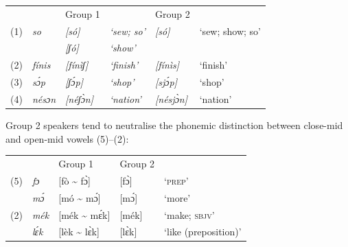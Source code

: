 \bigskip
\noindent\begin{tabularx}{\textwidth}{l llX lX}
 &  & Group 1 &  & Group 2 & \\
(1)





         & \itshape so & \itshape \textup{[só]} & \itshape \textup{‘sew; so’} & \itshape \textup{[só]}  & ‘sew; show; so’\\
&  & \itshape \textup{[ʃó]}  & \itshape \textup{‘show’} &  & \\
(2)




         & \itshape fínis & \itshape \textup{[fínìʃ]} & \itshape \textup{‘finish’} & \itshape \textup{[fínìs]} & ‘finish’\\
(3)





         & \itshape sɔ́p & \itshape \textup{[ʃɔ́p]} & \itshape \textup{‘shop’} & \itshape \textup{[sjɔ́p]} & ‘shop’\\
(4)





         & \itshape nésɔn & \itshape \textup{[néʃɔ̀n]} & \itshape \textup{‘nation’} & \itshape \textup{[nésjɔ̀n]} & ‘nation’\\
\end{tabularx}

\bigskip
Group 2 speakers tend to neutralise the phonemic distinction between close-mid and open-mid vowels (5)–(2):

\bigskip
\noindent\begin{tabularx}{\textwidth}{l lX lX}
 &  & Group 1 & Group 2 & \\
(5)





         & \itshape fɔ & [fò {\textasciitilde} fɔ̀] & [fɔ̀] & ‘\textsc{prep}’\\
& \itshape mɔ́ & [mó {\textasciitilde} mɔ́] & [mɔ́] & ‘more’\\
(2)





         & \itshape mék & [mék {\textasciitilde} mɛ́k] & [mék] & ‘make; \textsc{sbjv}’\\
& \itshape lɛ́k & [lèk {\textasciitilde} lɛ̀k] & [lɛ̀k] & ‘like (preposition)’\\
\end{tabularx}


